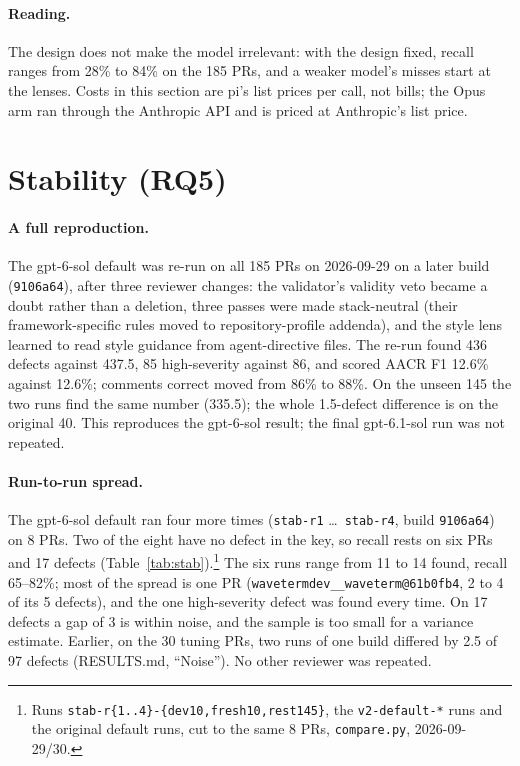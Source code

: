 \documentclass[11pt,a4paper]{article}
\newcommand{\code}[1]{\texttt{#1}}
\begin{document}
\paragraph{Reading.} The design does not make the model irrelevant: with the
design fixed, recall ranges from 28\% to 84\% on the 185 PRs, and a weaker
model's misses start at the lenses. Costs in this section are pi's list
prices per call, not bills; the Opus arm ran through the Anthropic API and is
priced at Anthropic's list price.

\section{Stability (RQ5)}
\label{sec:stability}

\paragraph{A full reproduction.} The gpt-6-sol default was re-run on all 185
PRs on 2026-09-29 on a later build (\code{9106a64}), after three reviewer
changes: the validator's validity veto became a doubt rather than a
deletion, three passes were made stack-neutral (their framework-specific
rules moved to repository-profile addenda), and the style lens learned to
read style guidance from agent-directive files. The re-run found 436 defects
against 437.5, 85 high-severity against 86, and scored AACR F1 12.6\%
against 12.6\%; comments correct moved from 86\% to 88\%. On the unseen 145
the two runs find the same number (335.5); the whole 1.5-defect difference
is on the original 40. This reproduces the gpt-6-sol result; the final
gpt-6.1-sol run was not repeated.

\paragraph{Run-to-run spread.} The gpt-6-sol default ran four more times
(\code{stab-r1} \ldots\ \code{stab-r4}, build \code{9106a64}) on 8 PRs. Two
of the eight have no defect in the key, so recall rests on six PRs and 17
defects (Table~\ref{tab:stab}).\footnote{Runs
\code{stab-r\{1..4\}-\{dev10,fresh10,rest145\}}, the \code{v2-default-*}
runs and the original default runs, cut to the same 8 PRs, \code{compare.py},
2026-09-29/30.} The six runs range from 11 to 14 found, recall 65--82\%;
most of the spread is one PR (\code{wavetermdev\_\_waveterm@61b0fb4}, 2 to 4
of its 5 defects), and the one high-severity defect was found every time. On
17 defects a gap of 3 is within noise, and the sample is too small for a
variance estimate. Earlier, on the 30 tuning PRs, two runs of one build
differed by 2.5 of 97 defects (RESULTS.md, ``Noise''). No other reviewer
was repeated.
\end{document}
